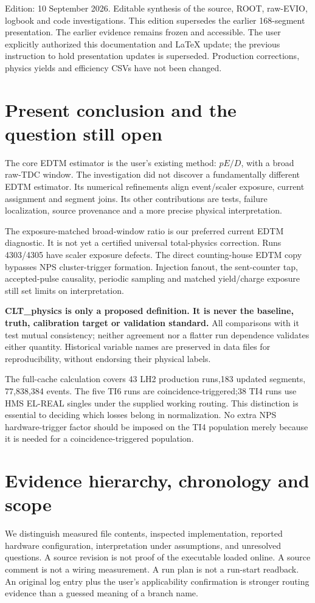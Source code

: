 Edition: 10 September 2026. Editable synthesis of the source, ROOT, raw-EVIO, logbook and code investigations. This edition supersedes the earlier 168-segment presentation. The earlier evidence remains frozen and accessible. The user explicitly authorized this documentation and LaTeX update; the previous instruction to hold presentation updates is superseded. Production corrections, physics yields and efficiency CSVs have not been changed.


\section{Present conclusion and the question still open}
The core EDTM estimator is the user's existing method: $pE/D$, with a broad raw-TDC window. The investigation did not discover a fundamentally different EDTM estimator. Its numerical refinements align event/scaler exposure, current assignment and segment joins. Its other contributions are tests, failure localization, source provenance and a more precise physical interpretation.


The exposure-matched broad-window ratio is our preferred current EDTM diagnostic. It is not yet a certified universal total-physics correction. Runs 4303/4305 have scaler exposure defects. The direct counting-house EDTM copy bypasses NPS cluster-trigger formation. Injection fanout, the sent-counter tap, accepted-pulse causality, periodic sampling and matched yield/charge exposure still set limits on interpretation.


\textbf{CLT\_physics is only a proposed definition. It is never the baseline, truth, calibration target or validation standard.} All comparisons with it test mutual consistency; neither agreement nor a flatter run dependence validates either quantity. Historical variable names are preserved in data files for reproducibility, without endorsing their physical labels.


The full-cache calculation covers 43 LH2 production runs,183 updated segments, 77,838,384 events. The five TI6 runs are coincidence-triggered;38 TI4 runs use HMS EL-REAL singles under the supplied working routing. This distinction is essential to deciding which losses belong in normalization. No extra NPS hardware-trigger factor should be imposed on the TI4 population merely because it is needed for a coincidence-triggered population.


\section{Evidence hierarchy, chronology and scope}
We distinguish measured file contents, inspected implementation, reported hardware configuration, interpretation under assumptions, and unresolved questions. A source revision is not proof of the executable loaded online. A source comment is not a wiring measurement. A run plan is not a run-start readback. An original log entry plus the user's applicability confirmation is stronger routing evidence than a guessed meaning of a branch name.


